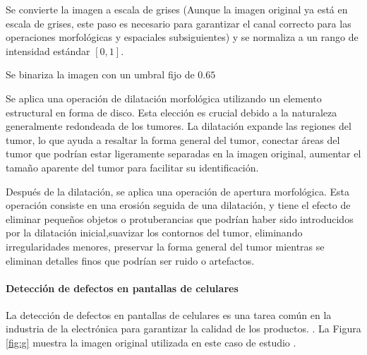 \begin{seriate}
\item Se convierte la imagen a escala de grises (Aunque la imagen original ya está en escala de grises, este paso es necesario para garantizar el canal correcto para las operaciones morfológicas y espaciales subsiguientes) y se normaliza a un rango de intensidad estándar \( [0, 1] \).

\item Se binariza la imagen con un umbral fijo de \( 0.65 \)

\item Se aplica una operación de dilatación morfológica utilizando un elemento estructural en forma de disco. Esta elección es crucial debido a la naturaleza generalmente redondeada de los tumores. La dilatación expande las regiones del tumor, lo que ayuda a resaltar la forma general del tumor, conectar áreas del tumor que podrían estar ligeramente separadas en la imagen original, aumentar el tamaño aparente del tumor para facilitar su identificación.

\item Después de la dilatación, se aplica una operación de apertura morfológica. Esta operación consiste en una erosión seguida de una dilatación, y tiene el efecto de eliminar pequeños objetos o protuberancias que podrían haber sido introducidos por la dilatación inicial,suavizar los contornos del tumor, eliminando irregularidades menores, preservar la forma general del tumor mientras se eliminan detalles finos que podrían ser ruido o artefactos.

\end{seriate}

\paragraph{Detección de defectos en pantallas de celulares} La detección de defectos en pantallas de celulares es una tarea común en la industria de la electrónica para garantizar la calidad de los productos. . La Figura \ref{fig:g} muestra la imagen original utilizada en este caso de estudio \autocite{MobilePhoneDefect}.

